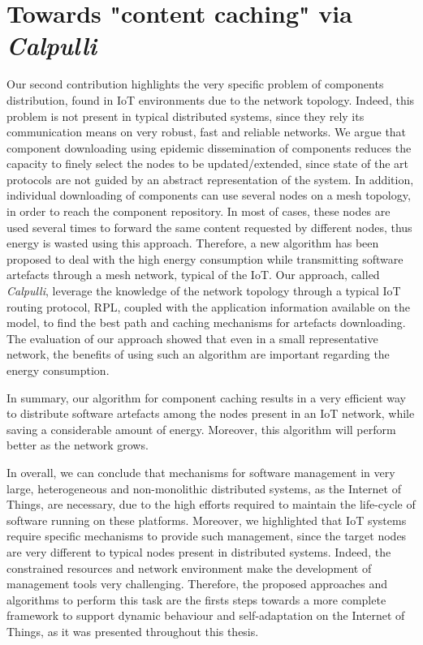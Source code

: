 \section{Towards "content caching" via \textit{Calpulli}}
Our second contribution highlights the very specific problem of components distribution, found in IoT environments due to the network topology.
Indeed, this problem is not present in typical distributed systems, since they rely its communication means on very robust, fast and reliable networks.
We argue that component downloading using epidemic dissemination of components reduces the capacity to finely select the nodes to be updated/extended, since state of the art protocols are not guided by an abstract representation of the system.
In addition, individual downloading of components can use several nodes on a mesh topology, in order to reach the component repository.
In most of cases, these nodes are used several times to forward the same content requested by different nodes, thus energy is wasted using this approach.
Therefore, a new algorithm has been proposed to deal with the high energy consumption while transmitting software artefacts through a mesh network, typical of the IoT.
Our approach, called \textit{Calpulli}, leverage the knowledge of the network topology through a typical IoT routing protocol, RPL, coupled with the application information available on the model, to find the best path and caching mechanisms for artefacts downloading.
The evaluation of our approach showed that even in a small representative network, the benefits of using such an algorithm are important regarding the energy consumption.

In summary, our algorithm for component caching results in a very efficient way to distribute software artefacts among the nodes present in an IoT network, while saving a considerable amount of energy.
Moreover, this algorithm will perform better as the network grows.

In overall, we can conclude that mechanisms for software management in very large, heterogeneous and non-monolithic distributed systems, as the Internet of Things, are necessary, due to the high efforts required to maintain the life-cycle of software running on these platforms.
Moreover, we highlighted that IoT systems require specific mechanisms to provide such management, since the target nodes are very different to typical nodes present in distributed systems.
Indeed, the constrained resources and network environment make the development of management tools very challenging.
Therefore, the proposed approaches and algorithms to perform this task are the firsts steps towards a more complete framework to support dynamic behaviour and self-adaptation on the Internet of Things, as it was presented  throughout this thesis.

